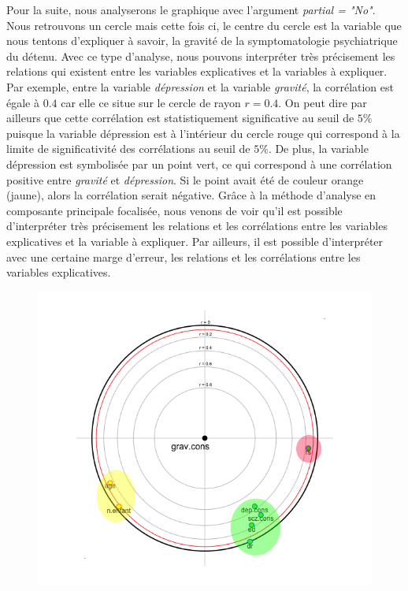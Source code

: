 Pour la suite, nous analyserons le graphique avec l'argument \textit{partial = "No"}.\newline
Nous retrouvons un cercle mais cette fois ci, le centre du cercle est la variable que nous tentons d'expliquer à savoir, la gravité de la symptomatologie psychiatrique du détenu.\newline
Avec ce type d'analyse, nous pouvons interpréter très précisement les relations qui existent entre les variables explicatives et la variables à expliquer. Par exemple, entre la variable \textit{dépression} et la variable \textit{gravité}, la corrélation est égale à $0.4$ car elle ce situe sur le cercle de rayon $r=0.4$. On peut dire par ailleurs que cette corrélation est statistiquement significative au seuil de $5\%$ puisque la variable dépression est à l'intérieur du cercle rouge qui correspond à la limite de significativité des corrélations au seuil de $5\%$.\newline
De plus, la variable dépression est symbolisée par un point vert, ce qui correspond à une corrélation positive entre \textit{gravité} et \textit{dépression}. Si le point avait été de couleur orange (jaune), alors la corrélation serait négative.\newline
Grâce à la méthode d'analyse en composante principale focalisée, nous venons de voir qu'il est possible d'interpréter très précisement les relations et les corrélations entre les variables explicatives et la variable à expliquer. Par ailleurs, il est possible d'interpréter avec une certaine marge d'erreur, les relations et les corrélations entre les variables explicatives.

\begin{figure}[H]\begin{center}\includegraphics[scale=0.5]{ilu/ACPFNoGroupe.png}\end{center}\end{figure}

